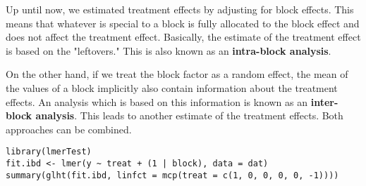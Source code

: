 Up until now, we estimated treatment effects by adjusting for block effects. This means that whatever is special to a block is fully allocated to the block effect and does not affect the treatment effect. Basically, the estimate of the treatment effect is based on the "leftovers." This is also known as an \textbf{intra-block analysis}. \medskip

On the other hand, if we treat the block factor as a random effect, the mean of the values of a block implicitly also contain information about the treatment effects. An analysis which is based on this information is known as an \textbf{inter-block analysis}. This leads to another estimate of the treatment effects. Both approaches can be combined. 

\begin{lstlisting}
library(lmerTest)
fit.ibd <- lmer(y ~ treat + (1 | block), data = dat)
summary(glht(fit.ibd, linfct = mcp(treat = c(1, 0, 0, 0, 0, -1))))
\end{lstlisting}
